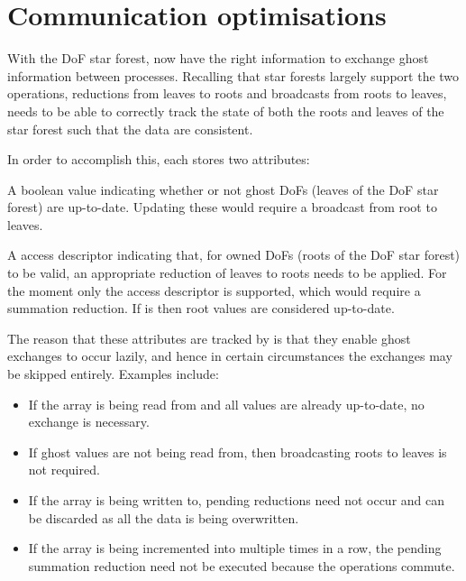 \documentclass[thesis]{subfiles}
\begin{document}
\section{Communication optimisations}
\label{sec:communication_optimisations}

With the DoF star forest,   now have the right information to exchange ghost information between processes.
Recalling that star forests largely support the two operations, reductions from leaves to roots and broadcasts from roots to leaves,  needs to be able to correctly track the state of both the roots and leaves of the star forest such that the data are consistent.

In order to accomplish this, each  stores two attributes:

\begin{paragraph}{}
  A boolean value indicating whether or not ghost DoFs (leaves of the DoF star forest) are up-to-date.
  Updating these would require a broadcast from root to leaves.
\end{paragraph}

\begin{paragraph}{}
  A  access descriptor indicating that, for owned DoFs (roots of the DoF star forest) to be valid, an appropriate reduction of leaves to roots needs to be applied.
  For the moment only the  access descriptor is supported, which would require a summation reduction.
  If  is  then root values are considered up-to-date.
\end{paragraph}

The reason that these attributes are tracked by  is that they enable ghost exchanges to occur lazily, and hence in certain circumstances the exchanges may be skipped entirely.
Examples include:

\begin{itemize}
  \item If the array is being read from and all values are already up-to-date, no exchange is necessary.
  \item If ghost values are not being read from, then broadcasting roots to leaves is not required.
  \item If the array is being written to, pending reductions need not occur and can be discarded as all the data is being overwritten.
  \item If the array is being incremented into multiple times in a row, the pending summation reduction need not be executed because the operations commute.
\end{itemize}
\end{document}
